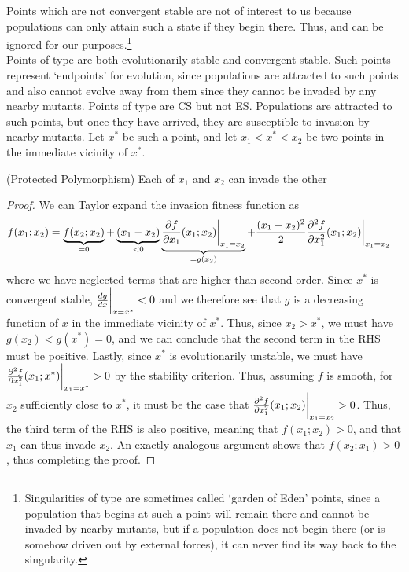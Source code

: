 Points which are not convergent stable are not of interest to us because populations can only attain such a state if they begin there. Thus,  and  can be ignored for our purposes.\footnote{Singularities of type  are sometimes called `garden of Eden' points, since a population that begins at such a point will remain there and cannot be invaded by nearby mutants, but if a population does not begin there (or is somehow driven out by external forces), it can never find its way back to the singularity.}\\
Points of type  are both evolutionarily stable and convergent stable. Such points represent `endpoints' for evolution, since populations are attracted to such points and also cannot evolve away from them since they cannot be invaded by any nearby mutants. Points of type  are CS but not ES. Populations are attracted to such points, but once they have arrived, they are susceptible to invasion by nearby mutants. Let $x^*$ be such a point, and let $x_1 < x^* < x_2$ be two points in the immediate vicinity of $x^*$.
\begin{claim}{(Protected Polymorphism)}
	Each of $x_1$ and $x_2$ can invade the other
\end{claim}
\begin{proof}
	We can Taylor expand the invasion fitness function as
	\begin{align*}
		f(x_1 ; x_2) &= \underbrace{f(x_2 ; x_2)}_{=0} + \underbrace{(x_1 - x_2)}_{< 0 }\underbrace{\frac{\partial f}{\partial x_1}(x_1 ; x_2)\bigg{|}_{x_1 = x_2}}_{=g(x_2)} + \frac{(x_1-x_2)^2}{2} \frac{\partial^2 f}{\partial x_1^2}(x_1 ; x_2)\bigg{|}_{x_1 = x_2}
	\end{align*}
	where we have neglected terms that are higher than second order. Since $x^*$ is convergent stable, $\frac{d g}{dx}\bigg{|}_{x=x^*} < 0$ and we therefore see that $g$ is a decreasing function of $x$ in the immediate vicinity of $x^*$. Thus, since $x_2 > x^*$, we must have $g(x_2) < g(x^*) = 0$, and we can conclude that the second term in the RHS must be positive. Lastly, since $x^*$ is evolutionarily unstable, we must have $\frac{\partial^2 f}{\partial x_1^2}(x_1 ; x^*)\bigg{|}_{x_1 = x^*} > 0$ by the stability criterion. Thus, assuming $f$ is smooth, for $x_2$ sufficiently close to $x^*$, it must be the case that $\frac{\partial^2 f}{\partial x_1^2}(x_1 ; x_2)\bigg{|}_{x_1 = x_2} > 0$. Thus, the third term of the RHS is also positive, meaning that $f(x_1 ; x_2) > 0$, and that $x_1$ can thus invade $x_2$. An exactly analogous argument shows that $f(x_2 ; x_1) > 0$, thus completing the proof.
\end{proof}
